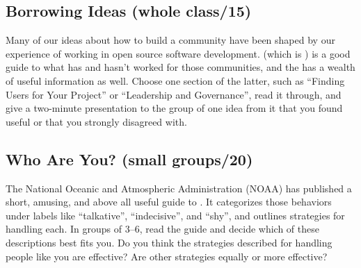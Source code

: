 \subsection*{Borrowing Ideas (whole class/15)}

Many of our ideas about how to build a community have been shaped by
our experience of working in open source software development.
\cite{Foge2005} (which is ) is a
good guide to what has and hasn't worked for those communities, and
the  has a wealth of
useful information as well. Choose one section of the latter, such as
``Finding Users for Your Project'' or ``Leadership and Governance'', read
it through, and give a two-minute presentation to the group of one
idea from it that you found useful or that you strongly disagreed
with.

\subsection*{Who Are You? (small groups/20)}

The National Oceanic and Atmospheric Administration (NOAA) has
published a short, amusing, and above all useful guide to . It categorizes those
behaviors under labels like ``talkative'', ``indecisive'', and ``shy'', and
outlines strategies for handling each. In groups of 3--6, read the
guide and decide which of these descriptions best fits you. Do you
think the strategies described for handling people like you are
effective? Are other strategies equally or more effective?
